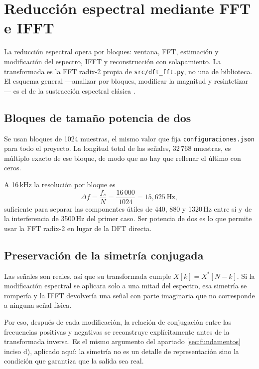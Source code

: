 
\section{Reducción espectral mediante FFT e IFFT}
\label{sec:espectral}

La reducción espectral opera por bloques: ventana, FFT, estimación y modificación
del espectro, IFFT y reconstrucción con solapamiento. La transformada es la FFT
radix-2 propia de \texttt{src/dft\_fft.py}, no una de biblioteca. El esquema general
—analizar por bloques, modificar la magnitud y resintetizar— es el de la
sustracción espectral clásica \cite{boll1979}.

\subsection{Bloques de tamaño potencia de dos}

Se usan bloques de 1024 muestras, el mismo valor que fija
\texttt{configuraciones.json} para todo el proyecto. La longitud total de las
señales, 32\,768 muestras, es múltiplo exacto de ese bloque, de modo que no hay
que rellenar el último con ceros.

A 16\,kHz la resolución por bloque es
\[
\Delta f = \frac{f_s}{N} = \frac{16\,000}{1024} = 15{,}625\ \text{Hz},
\]
suficiente para separar las componentes útiles de 440, 880 y 1320\,Hz entre sí y
de la interferencia de 3500\,Hz del primer caso. Ser potencia de dos es lo que
permite usar la FFT radix-2 en lugar de la DFT directa.

\subsection{Preservación de la simetría conjugada}

Las señales son reales, así que su transformada cumple $X[k]=X^{*}[N-k]$. Si la
modificación espectral se aplicara solo a una mitad del espectro, esa simetría se
rompería y la IFFT devolvería una señal con parte imaginaria que no corresponde a
ninguna señal física.

Por eso, después de cada modificación, la relación de conjugación entre las
frecuencias positivas y negativas se reconstruye explícitamente antes de la
transformada inversa. Es el mismo argumento del apartado \ref{sec:fundamentos}
inciso d), aplicado aquí: la simetría no es un detalle de representación sino la
condición que garantiza que la salida sea real.

